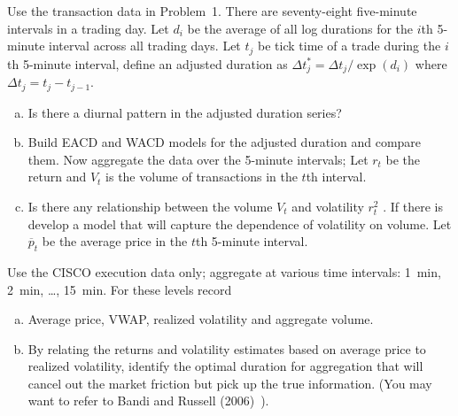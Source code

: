 \prob Use the transaction data in Problem~1. There are seventy-eight five-minute intervals in a trading day. Let $d_i$ be the average of all log durations for the $i$th 5-minute interval across all trading days. Let $t_j$ be tick time of a trade during the $i$th 5-minute interval, define an adjusted duration as $\Delta t_j^* = \Delta t_j/\exp(d_i)$ where $\Delta t_j = t_j - t_{j-1}$.
        \begin{enumerate}[(a)]
        \item Is there a diurnal pattern in the adjusted duration series?
        \item Build EACD and WACD models for the adjusted duration and compare them. Now aggregate the data over the 5-minute intervals; Let $r_t$ be the return and $V_t$ is the volume of transactions in the $t$th interval.
        \item Is there any relationship between the volume $V_t$ and volatility $r_t^2$ . If there is develop a model that will capture the dependence of volatility on volume. Let $\overline{p}_t$ be the average price in the $t$th 5-minute
        interval. \twomedskip
        \end{enumerate}


\prob Use the CISCO execution data only; aggregate at various time intervals: 1~min, 2~min, \dots, 15~min. For these levels record
        \begin{enumerate}[(a)]
        \item Average price, VWAP, realized volatility and aggregate volume.
        \item By relating the returns and volatility estimates based on average price to realized volatility, identify the optimal duration for aggregation that will cancel out the market friction but pick up the true information. (You may want to refer to Bandi and Russell (2006)~\cite{bandi}). \twomedskip
        \end{enumerate}
